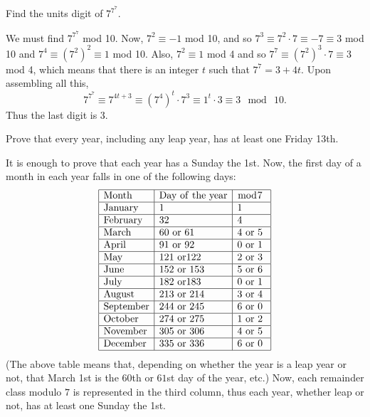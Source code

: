 
\begin{exa} Find the units digit of $7^{7^7}$.
\begin{sol}We must find $7^{7^7}$ mod 10. Now, $7^2 \equiv - 1$ mod
10, and so $7^3 \equiv 7^2 \cdot 7 \equiv -7 \equiv 3$ mod 10 and
$7^4 \equiv (7^2)^2 \equiv 1$ mod 10. Also, $7^2 \equiv 1$ mod 4
and so $7^7 \equiv (7^2)^3 \cdot 7 \equiv 3$ mod 4, which means
that there is an integer $t$ such that $7^7 = 3 + 4t.$ Upon
assembling all this,
$$ 7^{7^7} \equiv 7^{4t + 3} \equiv (7^4)^t \cdot 7^3 \equiv 1^t\cdot 3
\equiv 3 \  \bmod  \ 10. $$Thus the last digit is 3.
\end{sol}
\end{exa}
\begin{exa}
Prove that every year, including any leap year, has at least one
Friday 13th.
\begin{sol}
It is enough to prove that each year has a Sunday the
1st. Now, the first day of a month in each year falls in one of
the following days:
$$\begin{array}{|l|l|l|}
\hline {\rm Month} & {\rm Day\ of\ the\ year} & \bmod 7 \\
\hline {\rm January} &  1 & 1 \\
\hline {\rm February} &  32  & 4\  \\
\hline {\rm March} & 60 \ {\rm or}\ 61&  4\ {\rm or}\ 5\ \\
\hline {\rm April} & 91 \ {\rm or}\ 92& 0 \  {\rm or}\ 1 \\
\hline {\rm May} & 121\ {\rm or} 122 &  2\  {\rm or}\ 3\\
\hline {\rm June} & 152\ {\rm or}\ 153& 5\ {\rm or}\ 6\\
\hline {\rm July}&  182 \ {\rm or} 183\ &  0\ {\rm or}\ 1\\
\hline {\rm August}&  213\ {\rm or}\ 214 &  3\ {\rm or}\ 4\\
\hline {\rm September}& 244 \ {\rm or}\ 245&  6\ {\rm or}\ 0 \\
\hline {\rm October}&  274\ {\rm or}\ 275 &  1\ {\rm or}\ 2\\
\hline {\rm November}&  305\ {\rm or}\ 306&  4\ {\rm or}\ 5\\
\hline {\rm December}&  335\ {\rm or}\ 336&   6\ {\rm or}\ 0\\
\hline
\end{array}$$
(The above table means that, depending on whether the year is a leap
year or not, that March 1st is the $60$th or $61$st day of the year,
etc.) Now, each remainder class modulo $7$ is represented in the
third column, thus each year, whether leap or not, has at least one
Sunday the 1st.
\end{sol}
\end{exa}
